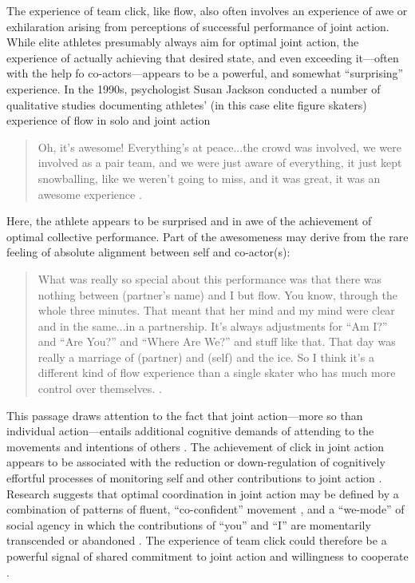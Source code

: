\begin{CJK}{UTF8}{gbsn}
The experience of team click, like flow, also often involves an experience of awe or exhilaration arising from perceptions of successful performance of joint action.  While elite athletes presumably always aim for optimal joint action, the experience of actually achieving that desired state, and even exceeding it---often with the help fo co-actors---appears to be a powerful, and somewhat ``surprising'' experience.  In the 1990s, psychologist Susan Jackson conducted a number of qualitative studies documenting athletes' (in this case elite figure skaters) experience of flow in solo and joint action

    \begin{quote}
      Oh, it's awesome! Everything's at peace...the crowd was involved, we were involved as a pair team, and we were just aware of everything, it just kept snowballing, like we weren’t going to miss, and it was great, it was an awesome experience \citep[168]{Jackson1992}.
    \end{quote}

Here, the athlete appears to be surprised and in awe of the achievement of optimal collective performance.  Part of the awesomeness may derive from the rare feeling of absolute alignment between self and co-actor(s):

    \begin{quote}
      What was really so special about this performance was that there was nothing between (partner's name) and I but flow.  You know, through the whole three minutes.  That meant that her mind and my mind were clear and in the same...in a partnership. It's always adjustments for ``Am I?'' and ``Are You?'' and ``Where Are We?'' and stuff like that.  That day was really a marriage of (partner) and (self) and the ice.  So I think it's a different kind of flow experience than a single skater who has much more control over themselves. \citep[173-4]{Jackson1992}.
    \end{quote}

This passage draws attention to the fact that joint action---more so than individual action---entails additional cognitive demands of attending to the movements and intentions of others \citep{Vesper2010}.  The achievement of click in joint action appears to be associated with the reduction or down-regulation of cognitively effortful processes of monitoring self and other contributions to joint action \citep{Dietrich2004b}. Research suggests that optimal coordination in joint action may be defined by a combination of patterns of fluent, ``co-confident'' movement \citep[in place of effortful monitoring; see]{Noy2015,Noy2017}, and a ``we-mode'' of social agency in which the contributions of ``you'' and ``I'' are momentarily transcended or abandoned \citep[see][]{Gallotti2013}.
The experience of team click could therefore be a powerful signal of shared commitment to joint action and willingness to cooperate \citep{Reddish2013a}. \\


\end{CJK}
